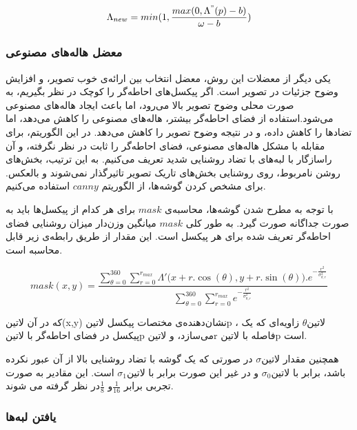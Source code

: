 \begin{equation}
	\Lambda_{new} = min(1, \frac{max(0, \Lambda^{"}(p) - b)}{\omega - b}) 
\end{equation}

\subsubsection{معضل هاله‌های مصنوعی  }

یکی دیگر از معضلات این روش، معضل انتخاب بین ارائه‌ی خوب تصویر، و افزایش وضوح جزئیات در تصویر است. اگر پیکسل‌های احاطه‌گر را کوچک در نظر بگیریم، به صورت محلی وضوح تصویر بالا می‌رود، اما باعث ایجاد هاله‌های مصنوعی می‌شود.استفاده از فضای احاطه‌گر بیشتر، هاله‌های مصنوعی را کاهش می‌دهد، اما تضادها را کاهش داده، و در نتیجه وضوح تصویر را کاهش می‌دهد.
در این الگوریتم، برای مقابله با مشکل هاله‌های مصنوعی، فضای احاطه‌گر را ثابت در نظر نگرفته، و آن راسازگار با لبه‌های با تضاد روشنایی شدید تعریف می‌کنیم. به این ترتیب، بخش‌های روشن نامربوط، روی روشنایی بخش‌های تاریک تصویر تاثیرگذار نمی‌شوند و بالعکس. 
برای مشخص کردن گوشه‌ها، از الگوریتم $canny$ استفاده می‌کنیم.

با توجه به مطرح شدن گوشه‌ها،  محاسبه‌ی $mask$ برای هر کدام از پیکسل‌ها باید به صورت جداگانه صورت گیرد. به طور کلی $mask$ میانگین وزن‌دار میزان روشنایی فضای احاطه‌گر تعریف شده برای هر پیکسل است. این مقدار از طریق رابطه‌ی زیر قابل محاسبه است. 

\begin{equation}
	mask(x,y) = \frac
	{\sum_{\theta=0}^{360}\sum_{r=0}^{r_{max}}
		\Lambda'\big(x+r.\cos(\theta), y+r.\sin(\theta) \big).e^{-\frac{r^2}{\sigma_{\theta,r}^2}}}
	{\sum_{\theta=0}^{360}\sum_{r=0}^{r_{max}}e^{-\frac{r^2}{\sigma_{\theta,r}^2}}}
\end{equation}

 
 که در آن 
 ‌لاتین{(x,y) }
 نشان‌دهنده‌ی مختصات پیکسل
  ‌لاتین{p } ، 
  ‌لاتین{$ \theta $ }
 زاویه‌ای که یک پیکسل در فضای احاطه‌گر با 
  ‌لاتین{p } 
 می‌سازد، و 
  ‌لاتین{r }
 فاصله  با
  ‌لاتین{p } 
   است.
 
 همچنین مقدار  
   ‌لاتین{$\sigma$}
  در صورتی که  یک گوشه با تضاد روشنایی بالا از آن عبور نکرده باشد، برابر با 
   ‌لاتین{$\sigma_{0}$}
   و در غیر این صورت برابر با 
   ‌لاتین{$\sigma_{1}$}
   است.
این مقادیر به صورت تجربی برابر $\frac{1}{16} $و $\frac{1}{8} $در نظر گرفته می شوند.
 
 \subsubsection{یافتن لبه‌ها }
 
